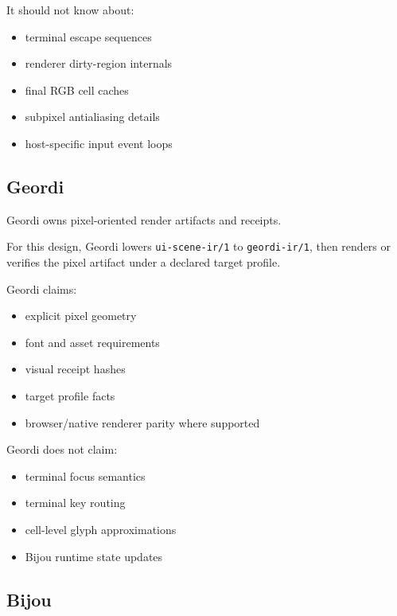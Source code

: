It should not know about:

\begin{itemize}
\tightlist
\item
  terminal escape sequences
\item
  renderer dirty-region internals
\item
  final RGB cell caches
\item
  subpixel antialiasing details
\item
  host-specific input event loops
\end{itemize}

\subsection{Geordi}\label{record-138-geordi}

Geordi owns pixel-oriented render artifacts and receipts.

For this design, Geordi lowers \texttt{u\allowbreak{}i\allowbreak{}-\allowbreak{}s\allowbreak{}c\allowbreak{}e\allowbreak{}n\allowbreak{}e\allowbreak{}-\allowbreak{}i\allowbreak{}r\allowbreak{}/\allowbreak{}1} to \texttt{g\allowbreak{}e\allowbreak{}o\allowbreak{}r\allowbreak{}d\allowbreak{}i\allowbreak{}-\allowbreak{}i\allowbreak{}r\allowbreak{}/\allowbreak{}1}, then renders or verifies the pixel artifact under a declared target profile.

Geordi claims:

\begin{itemize}
\tightlist
\item
  explicit pixel geometry
\item
  font and asset requirements
\item
  visual receipt hashes
\item
  target profile facts
\item
  browser/native renderer parity where supported
\end{itemize}

Geordi does not claim:

\begin{itemize}
\tightlist
\item
  terminal focus semantics
\item
  terminal key routing
\item
  cell-level glyph approximations
\item
  Bijou runtime state updates
\end{itemize}

\subsection{Bijou}\label{record-138-bijou}

